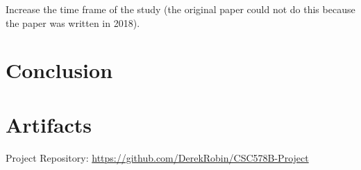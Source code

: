 \documentclass[acmconf]{acmart}
\begin{document}
Increase the time frame of the study (the original paper could not do this because the paper was written in 2018).

\section{Conclusion}




\appendix

\section{Artifacts}
Project Repository: \url{https://github.com/DerekRobin/CSC578B-Project}
\end{document}
